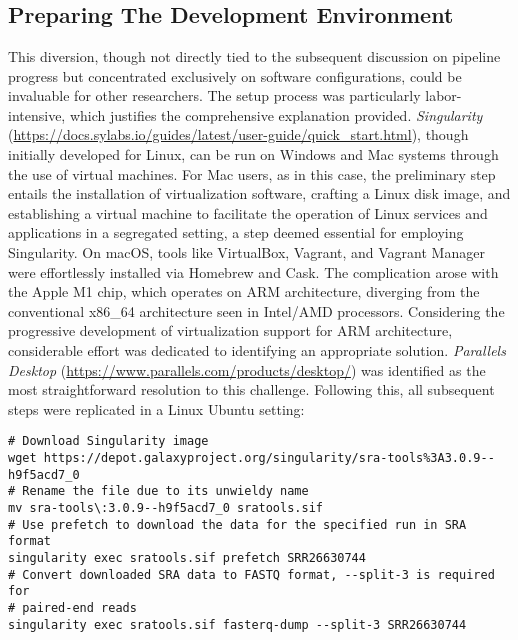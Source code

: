 \appendix

\chapter{}

\section{Preparing The Development Environment}

This diversion, though not directly tied to the subsequent discussion on pipeline progress but concentrated exclusively on software configurations, could be invaluable for other researchers. The setup process was particularly labor-intensive, which justifies the comprehensive explanation provided. \textit{Singularity} (\url{https://docs.sylabs.io/guides/latest/user-guide/quick_start.html}), though initially developed for Linux, can be run on Windows and Mac systems through the use of virtual machines. For Mac users, as in this case, the preliminary step entails the installation of virtualization software, crafting a Linux disk image, and establishing a virtual machine to facilitate the operation of Linux services and applications in a segregated setting, a step deemed essential for employing Singularity. On macOS, tools like VirtualBox, Vagrant, and Vagrant Manager were effortlessly installed via Homebrew and Cask. The complication arose with the Apple M1 chip, which operates on ARM architecture, diverging from the conventional x86\_64 architecture seen in Intel/AMD processors. Considering the progressive development of virtualization support for ARM architecture, considerable effort was dedicated to identifying an appropriate solution. \textit{Parallels Desktop} (\url{https://www.parallels.com/products/desktop/}) was identified as the most straightforward resolution to this challenge. Following this, all subsequent steps were replicated in a Linux Ubuntu setting:

\begin{verbatim}
# Download Singularity image
wget https://depot.galaxyproject.org/singularity/sra-tools%3A3.0.9--h9f5acd7_0
# Rename the file due to its unwieldy name
mv sra-tools\:3.0.9--h9f5acd7_0 sratools.sif
# Use prefetch to download the data for the specified run in SRA format
singularity exec sratools.sif prefetch SRR26630744
# Convert downloaded SRA data to FASTQ format, --split-3 is required for
# paired-end reads
singularity exec sratools.sif fasterq-dump --split-3 SRR26630744
\end{verbatim}

